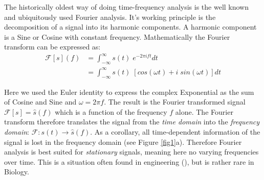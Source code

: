 The historically oldest way of doing time-frequency analysis is the well known and ubiquitously used Fourier analysis. It's working principle is the decomposition of a signal into its harmonic components. A harmonic component is a Sine or Cosine with constant frequency. Mathematically the Fourier transform can be expressed as:
\begin{align}
  \mathcal{F}[s](f) &= \int_{-\infty}^{\infty} s(t)\;e^{-2\pi i f t} dt \\
  &= \int_{-\infty}^{\infty} s(t)\; \left[cos(\omega t) + i\;sin(\omega t) \right] dt
\end{align}

Here we used the Euler identity to express the complex Exponential as the sum of Cosine and Sine and $\omega = 2\pi f$. The result is the Fourier transformed signal $\mathcal{F}[s] = \hat{s}(f)$ which is a function of the frequency $f$ alone. The Fourier transform therefore translates the signal from the \textit{time domain} into the \textit{frequency domain}: $\mathcal{F} : s(t) \rightarrow \hat{s}(f)$. As a corollary, all time-dependent information of the signal is lost in the frequency domain (see Figure \ref{fig1}a). Therefore Fourier analysis is best suited for \textit{stationary} signals, meaning here no varying frequencies over time. This is a situation often found in engineering (\cite{Smith1997}), but is rather rare in Biology.
